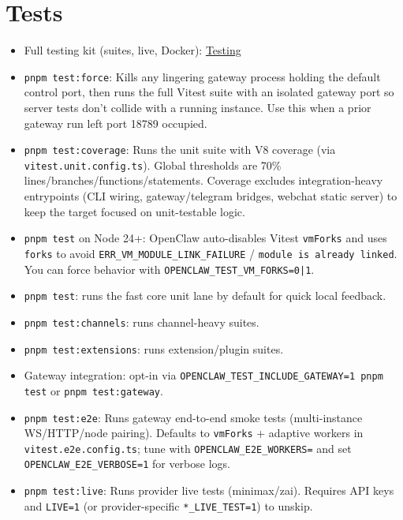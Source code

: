 \clearpage

\section{Tests}


\begin{itemize}
  \item Full testing kit (suites, live, Docker): \href{/help/testing}{Testing}
\end{itemize}


\begin{itemize}
  \item \texttt{pnpm test:force}: Kills any lingering gateway process holding the default control port, then runs the full Vitest suite with an isolated gateway port so server tests don’t collide with a running instance. Use this when a prior gateway run left port 18789 occupied.
  \item \texttt{pnpm test:coverage}: Runs the unit suite with V8 coverage (via \texttt{vitest.unit.config.ts}). Global thresholds are 70\% lines/branches/functions/statements. Coverage excludes integration-heavy entrypoints (CLI wiring, gateway/telegram bridges, webchat static server) to keep the target focused on unit-testable logic.
  \item \texttt{pnpm test} on Node 24+: OpenClaw auto-disables Vitest \texttt{vmForks} and uses \texttt{forks} to avoid \texttt{ERR\_VM\_MODULE\_LINK\_FAILURE} / \texttt{module is already linked}. You can force behavior with \texttt{OPENCLAW\_TEST\_VM\_FORKS=0|1}.
  \item \texttt{pnpm test}: runs the fast core unit lane by default for quick local feedback.
  \item \texttt{pnpm test:channels}: runs channel-heavy suites.
  \item \texttt{pnpm test:extensions}: runs extension/plugin suites.
  \item Gateway integration: opt-in via \texttt{OPENCLAW\_TEST\_INCLUDE\_GATEWAY=1 pnpm test} or \texttt{pnpm test:gateway}.
  \item \texttt{pnpm test:e2e}: Runs gateway end-to-end smoke tests (multi-instance WS/HTTP/node pairing). Defaults to \texttt{vmForks} + adaptive workers in \texttt{vitest.e2e.config.ts}; tune with \texttt{OPENCLAW\_E2E\_WORKERS=} and set \texttt{OPENCLAW\_E2E\_VERBOSE=1} for verbose logs.
  \item \texttt{pnpm test:live}: Runs provider live tests (minimax/zai). Requires API keys and \texttt{LIVE=1} (or provider-specific \texttt{*\_LIVE\_TEST=1}) to unskip.
\end{itemize}


